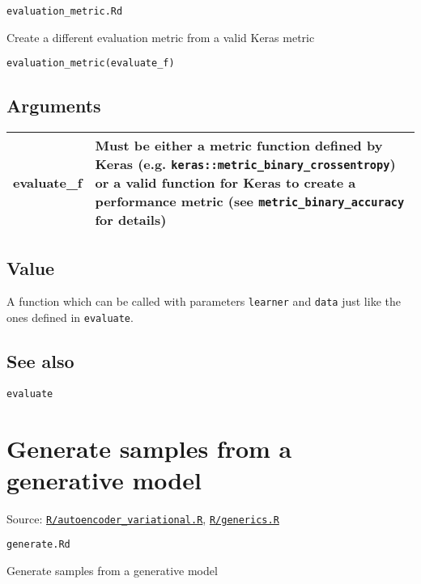 \texttt{evaluation\_metric.Rd}

Create a different evaluation metric from a valid Keras metric

\begin{verbatim}
evaluation_metric(evaluate_f)
\end{verbatim}

\hypertarget{arguments}{\subsection{\texorpdfstring{\protect\hyperlink{arguments}{}Arguments}{Arguments}}\label{arguments}}

\begin{longtable}[c]{@{}ll@{}}
\toprule
evaluate\_f & Must be either a metric function defined by Keras (e.g.
\texttt{keras::metric\_binary\_crossentropy}) or a valid function for
Keras to create a performance metric (see
\texttt{metric\_binary\_accuracy} for details)\tabularnewline
\bottomrule
\end{longtable}

\hypertarget{value}{\subsection{\texorpdfstring{\protect\hyperlink{value}{}Value}{Value}}\label{value}}

A function which can be called with parameters \texttt{learner} and
\texttt{data} just like the ones defined in \texttt{evaluate}.

\hypertarget{see-also}{\subsection{\texorpdfstring{\protect\hyperlink{see-also}{}See
also}{See also}}\label{see-also}}

\texttt{evaluate}

\section{Generate samples from a generative
model}\label{generate-samples-from-a-generative-model}

Source:
\href{https://github.com/fdavidcl/ruta/blob/master/R/autoencoder_variational.R}{\texttt{R/autoencoder\_variational.R}},
\href{https://github.com/fdavidcl/ruta/blob/master/R/generics.R}{\texttt{R/generics.R}}

\texttt{generate.Rd}

Generate samples from a generative model

